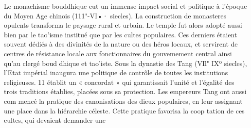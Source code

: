 Le monachisme bouddhique eut un immense impact social et politique à l'époque du Moyen­ Age chinois (111"-VI•· siecles). La construction de monasteres opulents transforma le paysage rural et urbain. Le temple fut alors adopté aussi bien par le tao'isme institué que par les cultes populaires. Ces derniers étaient souvent dédiés à des divinités de la nature ou des héros locaux, et servirent de centres de résistance locale aux fonctionnaires du gouvemement central ainsi qu'au clergé boud­ dhique et tao'iste. Sous la dynastie des Tang (VIl"­ IXº siecles), l'Etat impérial inaugura une politique de contrôle de toutes les institutions religieuses. 11 établit un « concordat » qui garantissait l'unité et l'égalité des trois traditions établies, placées sous sa protection. Les empereurs Tang ont aussi com­ mencé la pratique des canonisations des dieux populaires, en leur assignant une place dans la hiérarchie céleste. Cette pratique favorisa la coop­ tation de ces cultes, qui devaient demander une
 
